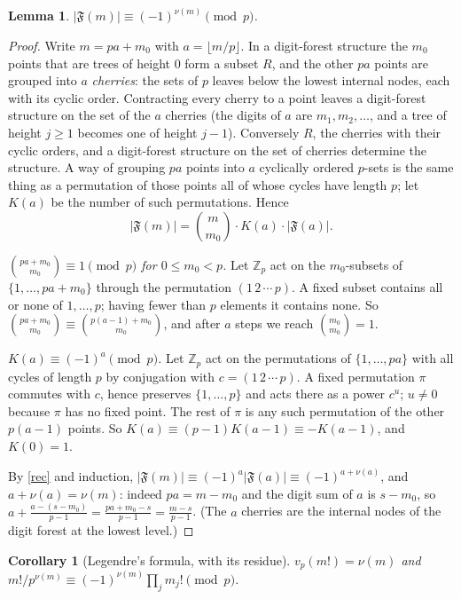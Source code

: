 \documentclass[11pt]{article}
\newtheorem{lemma}{Lemma}
\newtheorem{corollary}{Corollary}
\theoremstyle{remark}
\newcommand{\Z}{\mathbb Z}
\newcommand{\F}{\mathfrak F}
\begin{document}
\begin{lemma}\label{L4}
$|\F(m)|\equiv(-1)^{\nu(m)}\pmod p$.
\end{lemma}
\begin{proof}
Write $m=pa+m_0$ with $a=\lfloor m/p\rfloor$. In a digit-forest structure the $m_0$ points
that are trees of height $0$ form a subset $R$, and the other $pa$ points are grouped into $a$
\emph{cherries}: the sets of $p$ leaves below the lowest internal nodes, each with its cyclic
order. Contracting every cherry to a point leaves a digit-forest structure on the set of the
$a$ cherries (the digits of $a$ are $m_1,m_2,\dots$, and a tree of height $j\ge1$ becomes one
of height $j-1$). Conversely $R$, the cherries with their cyclic orders, and a digit-forest
structure on the set of cherries determine the structure. A way of grouping $pa$ points into
$a$ cyclically ordered $p$-sets is the same thing as a permutation of those points all of
whose cycles have length $p$; let $K(a)$ be the number of such permutations. Hence
\begin{equation}\label{rec}
 |\F(m)|=\binom{m}{m_0}\cdot K(a)\cdot|\F(a)| .
\end{equation}

\emph{$\binom{pa+m_0}{m_0}\equiv1\pmod p$ for $0\le m_0<p$.} Let $\Z_p$ act on the
$m_0$-subsets of $\{1,\dots,pa+m_0\}$ through the permutation $(1\,2\,\cdots\,p)$. A fixed
subset contains all or none of $1,\dots,p$; having fewer than $p$ elements it contains none.
So $\binom{pa+m_0}{m_0}\equiv\binom{p(a-1)+m_0}{m_0}$, and after $a$ steps we reach
$\binom{m_0}{m_0}=1$.

\emph{$K(a)\equiv(-1)^a\pmod p$.} Let $\Z_p$ act on the permutations of $\{1,\dots,pa\}$ with
all cycles of length $p$ by conjugation with $c=(1\,2\,\cdots\,p)$. A fixed permutation $\pi$
commutes with $c$, hence preserves $\{1,\dots,p\}$ and acts there as a power $c^u$; $u\ne0$
because $\pi$ has no fixed point. The rest of $\pi$ is any such permutation of the other
$p(a-1)$ points. So $K(a)\equiv(p-1)K(a-1)\equiv-K(a-1)$, and $K(0)=1$.

By \eqref{rec} and induction, $|\F(m)|\equiv(-1)^a|\F(a)|\equiv(-1)^{a+\nu(a)}$, and
$a+\nu(a)=\nu(m)$: indeed $pa=m-m_0$ and the digit sum of $a$ is $s-m_0$, so
$a+\frac{a-(s-m_0)}{p-1}=\frac{pa+m_0-s}{p-1}=\frac{m-s}{p-1}$. (The $a$ cherries are the
internal nodes of the digit forest at the lowest level.)
\end{proof}

\begin{corollary}[Legendre's formula, with its residue]
$v_p(m!)=\nu(m)$ and $m!/p^{\nu(m)}\equiv(-1)^{\nu(m)}\prod_jm_j!\pmod p$.
\end{corollary}
\end{document}
